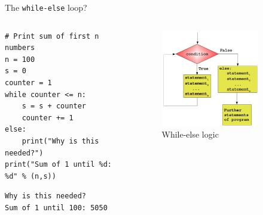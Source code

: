 \documentclass[presentation]{beamer}
\begin{document}
\begin{frame}[label={sec:org14ad0bc},fragile]{The \texttt{while-else} loop?}
 \begin{columns}
\begin{column}{0.48\columnwidth}
\scriptsize
\begin{verbatim}
# Print sum of first n numbers
n = 100
s = 0
counter = 1
while counter <= n:
    s = s + counter
    counter += 1
else:
    print("Why is this needed?")
print("Sum of 1 until %d: %d" % (n,s))
\end{verbatim}

\begin{verbatim}
Why is this needed?
Sum of 1 until 100: 5050
\end{verbatim}
\end{column}

\begin{column}{0.45\columnwidth}
\footnotesize
\begin{figure}[htbp]
\centering
\includegraphics[width=0.8\textwidth]{images/while_loop_with_else.png}
\caption{While-else logic}
\end{figure}
\end{column}
\end{columns}

\end{frame}
\end{document}
